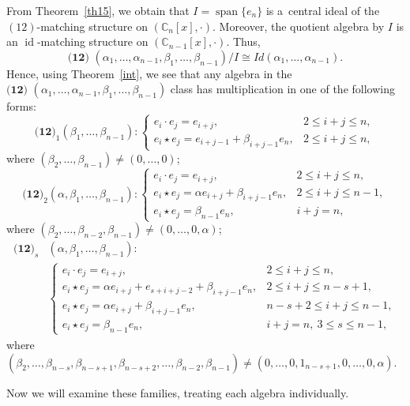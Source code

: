 \documentclass{jonasart}
\DeclareMathOperator{\id}{id}
\begin{document}
	From Theorem~\ref{th15}, we obtain that $I = \operatorname{span}\{e_n\}$ is a~central ideal of the $(12)$-matching structure on $(\mathbb{C}_n [x], \cdot).$ Moreover, the quotient algebra by $I$ is an $\id$-matching structure on $(\mathbb{C}_{n-1}[x], \cdot).$ Thus,
	\[
		\textbf{(12) }(\alpha_1,\dots, \alpha_{n-1}, \beta_1,\dots, \beta_{n-1}) / I \cong Id(\alpha_1, \dots,\alpha_{n-1}).
	\]
	Hence, using Theorem~\ref{int}, we see that any algebra in the $\textbf{(12) }(\alpha_1,\dots, \alpha_{n-1}, \beta_1,\dots, \beta_{n-1})$ class has multiplication in one of the following forms:
	\[
		\textbf{(12)}_1 (\beta_1,\dots,\beta_{n-1}):\left\{
		\begin{array}{ll}
			e_i \cdot e_j =e_{i+j}, & 2\leq i+j \leq n, \\[1mm]
			e_i \star e_j =e_{i+j-1}+\beta_{i+j-1}e_n, & 2\leq i+j \leq n,
		\end{array}
		\right.
	\]
	where $(\beta_2, \dots, \beta_{n-1}) \neq (0, \dots, 0)$;
	\[
		\textbf{(12)}_2 (\alpha,\beta_1,\dots,\beta_{n-1}):\left\{
		\begin{array}{ll}
			e_i\cdot e_j =e_{i+j}, & 2\leq i+j \leq n, \\[1mm]
			e_i \star e_j = \alpha e_{i+j} +\beta_{i+j-1}e_n, & 2\leq i+j \leq n-1,\\[1mm]
			e_i \star e_j = \beta_{n-1}e_n, & i+j=n,
		\end{array}
		\right.
	\]
	where $(\beta_2, \dots, \beta_{n-2}, \beta_{n-1}) \neq (0, \dots, 0, \alpha)$;
	\begin{align*}
		\textbf{(12)}_s &(\alpha, \beta_1,\dots,\beta_{n-1}): \\
        &\left\{
		\begin{array}{ll}
			e_i\cdot e_j =e_{i+j}, & 2\leq i+j \leq n, \\[1mm]
			e_i \star e_j = \alpha e_{i+j} + e_{s+i+j-2}+\beta_{i+j-1}e_n, & 2\leq i+j \leq n-s+1, \\[1mm]
			e_i \star e_j = \alpha e_{i+j} +\beta_{i+j-1}e_n, & n-s+2\leq i+j \leq n-1,\\[1mm]
			e_i \star e_j = \beta_{n-1}e_n, & i+j=n, \ 3\leq s\leq n-1,
		\end{array}
		\right.
	\end{align*}
	where $(\beta_2, \dots,\beta_{n-s}, \beta_{n-s+1}, \beta_{n-s+2}, \dots, \beta_{n-2}, \beta_{n-1}) \neq (0, \dots, 0, 1_{n-s+1}, 0, \dots, 0, \alpha).$

	Now we will examine these families, treating each algebra individually.
\end{document}
